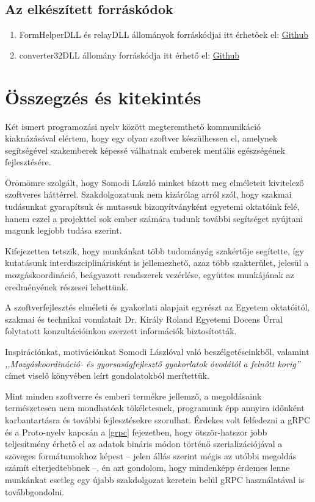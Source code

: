 \documentclass[tocnopagenum]{thesis-ekf}
\begin{document}
	\subsection{Az elkészített forráskódok}
	\begin{enumerate}
		\item FormHelperDLL és relayDLL állományok forráskódjai itt érhetőek el: \hyperref{https://github.com/nagytoth1/dzkbx0_thesis_repo}{}{}{Github}
		\item converter32DLL állomány forráskódja itt érhető el: \hyperref{https://github.com/nagytoth1/jsonConverterC/}{}{}{Github}
	\end{enumerate}
	
	\section{Összegzés és kitekintés}
	Két ismert programozási nyelv között megteremthető kommunikáció kiaknázásával elértem, hogy egy olyan szoftver készülhessen el, amelynek segítségével szakemberek képessé válhatnak emberek mentális egészségének fejlesztésére. 
	
	Örömömre szolgált, hogy Somodi László minket bízott meg elméleteit kivitelező szoftveres háttérrel. Szakdolgozatunk nem kizárólag arról szól, hogy szakmai tudásunkat gyarapítsuk és mutassuk bizonyítványként egyetemi oktatóink felé, hanem ezzel a projekttel sok ember számára tudunk további segítséget nyújtani magunk legjobb tudása szerint.
	
	Kifejezetten tetszik, hogy munkánkat több tudományág szakértője segítette, így kutatásunk interdiszciplinárisként is jellemezhető, azaz több szakterület, jelesül a mozgáskoordináció, beágyazott rendszerek vezérlése, együttes munkájának az eredményének részesei lehettünk.
	
	A szoftverfejlesztés elméleti és gyakorlati alapjait egyrészt az Egyetem oktatóitól, szakmai és technikai vonulatait Dr. Király Roland Egyetemi Docens Úrral folytatott konzultációinkon szerzett információk biztosították. 
	
	Inspirációnkat, motivációnkat Somodi Lászlóval való beszélgetéseinkből, valamint \textit{,,Mozgáskoordináció- és gyorsaságfejlesztő gyakorlatok óvodától a felnőtt korig''} címet viselő könyvében leírt gondolatokból merítettük.
	
	Mint minden szoftverre és emberi termékre jellemző, a megoldásaink természetesen nem mondhatóak tökéletesnek, programunk épp annyira időnként karbantartásra és további fejlesztésekre szorulhat. Érdekes volt felfedezni a gRPC és a Proto-nyelv kapcsán a \ref{grpc} fejezetben, hogy ötször-hatszor jobb teljesítmény érhető el az adatok bináris módon történő szerializációjával a szöveges formátumokhoz képest -- jelen állás szerint mégis az utóbbi megoldás számít elterjedtebbnek --, én azt gondolom, hogy mindenképp érdemes lenne munkánkat esetleg egy újabb szakdolgozat keretein belül gRPC használatával is továbbgondolni.
	\newpage
\end{document}
